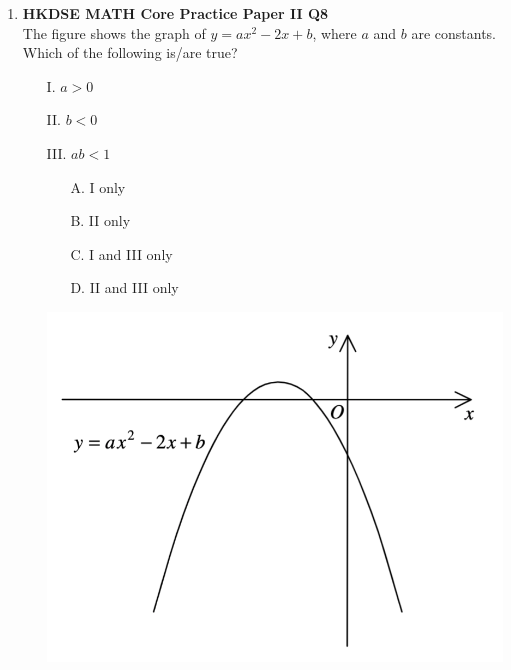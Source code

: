 \documentclass[12pt]{article}
\begin{document}
\begin{enumerate}
	\item \textbf{HKDSE MATH Core Practice Paper II Q8}\\
	The figure shows the graph of $y = ax^2 - 2x + b$, where $a$ and $b$ are constants. Which of the following is/are true?
	\begin{enumerate}
		\item[I.] $a > 0$
		\item[II.] $b < 0$
		\item[III.] $ab < 1$
		\item[]
			\begin{minipage}[u]{.39\textwidth}
				\begin{enumerate}
					\item[A.] I only
					\item[B.] II only
					\item[C.] I and III only
					\item[D.] II and III only
				\end{enumerate}
			\end{minipage}
			\begin{minipage}[u]{.5\textwidth}
				\centering
				\includegraphics[scale=0.6]{PPFigure2.8.png}
			\end{minipage}
	\end{enumerate}
		

\end{enumerate}
\end{document}

